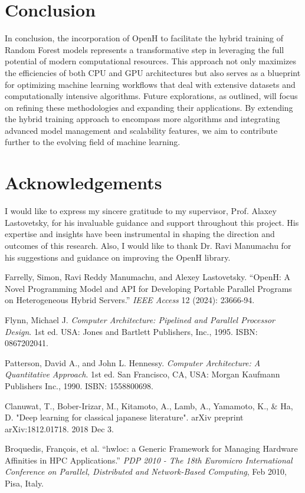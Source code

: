 \documentclass[11.5pt]{article}
\begin{document}
\section{Conclusion}
In conclusion, the incorporation of OpenH to facilitate the hybrid training of Random Forest models represents a transformative step in leveraging the full potential of modern computational resources.
This approach not only maximizes the efficiencies of both CPU and GPU architectures but also serves as a blueprint for optimizing machine learning workflows that deal with extensive datasets and computationally intensive algorithms.
Future explorations, as outlined, will focus on refining these methodologies and expanding their applications. By extending the hybrid training approach to encompass more algorithms and integrating advanced model management and scalability features, we aim to contribute further to the evolving field of machine learning. 


\section{Acknowledgements}
I would like to express my sincere gratitude to my supervisor, Prof. Alaxey Lastovetsky, for his invaluable guidance and support throughout this project. 
His expertise and insights have been instrumental in shaping the direction and outcomes of this research. 
Also, I would like to thank Dr. Ravi Manumachu for his suggestions and guidance on improving the OpenH library. 

\newpage
\begin{thebibliography}{9} %

    Farrelly, Simon, Ravi Reddy Manumachu, and Alexey Lastovetsky. 
    ``OpenH: A Novel Programming Model and API for Developing Portable Parallel Programs on Heterogeneous Hybrid Servers.'' 
    \textit{IEEE Access} 12 (2024): 23666-94.
    
    Flynn, Michael J. 
    \textit{Computer Architecture: Pipelined and Parallel Processor Design}. 
    1st ed. USA: Jones and Bartlett Publishers, Inc., 1995. 
    ISBN: 0867202041.
    
    Patterson, David A., and John L. Hennessy. 
    \textit{Computer Architecture: A Quantitative Approach}. 
    1st ed. San Francisco, CA, USA: Morgan Kaufmann Publishers Inc., 1990. 
    ISBN: 1558800698.

    Clanuwat, T., Bober-Irizar, M., Kitamoto, A., Lamb, A., Yamamoto, K., \& Ha, D.
    "Deep learning for classical japanese literature".
    arXiv preprint arXiv:1812.01718. 2018 Dec 3.

    Broquedis, François, et al. 
    ``hwloc: a Generic Framework for Managing Hardware Affinities in HPC Applications.''
    \textit{PDP 2010 - The 18th Euromicro International Conference on Parallel, Distributed and Network-Based Computing}, Feb 2010, Pisa, Italy.

    
\end{thebibliography}
\end{document}
